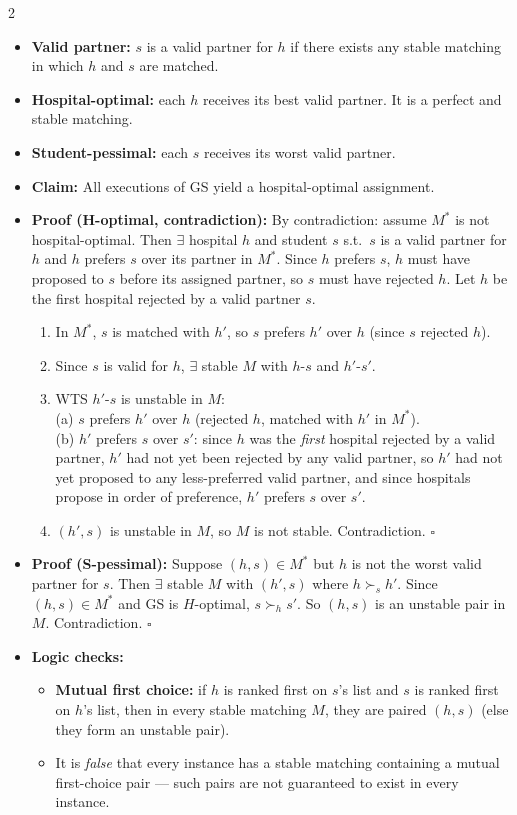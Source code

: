 \documentclass[9pt]{article}
\begin{document}
\begin{multicols}{2}
\begin{itemize}
  \item \textbf{Valid partner:} $s$ is a valid partner for $h$ if there exists any stable matching in which $h$ and $s$ are matched.
  \item \textbf{Hospital-optimal:} each $h$ receives its best valid partner. It is a perfect and stable matching.
  \item \textbf{Student-pessimal:} each $s$ receives its worst valid partner.
  \item \textbf{Claim:} All executions of GS yield a hospital-optimal assignment.
  \item \textbf{Proof (H-optimal, contradiction):} By contradiction: assume $M^*$ is not hospital-optimal. Then $\exists$ hospital $h$ and student $s$ s.t.\ $s$ is a valid partner for $h$ and $h$ prefers $s$ over its partner in $M^*$. Since $h$ prefers $s$, $h$ must have proposed to $s$ before its assigned partner, so $s$ must have rejected $h$. Let $h$ be the first hospital rejected by a valid partner $s$.
  \begin{enumerate}
    \item In $M^*$, $s$ is matched with $h'$, so $s$ prefers $h'$ over $h$ (since $s$ rejected $h$).
    \item Since $s$ is valid for $h$, $\exists$ stable $M$ with $h$-$s$ and $h'$-$s'$.
    \item WTS $h'$-$s$ is unstable in $M$:\\
      (a) $s$ prefers $h'$ over $h$ (rejected $h$, matched with $h'$ in $M^*$).\\
      (b) $h'$ prefers $s$ over $s'$: since $h$ was the \emph{first} hospital rejected by a valid partner, $h'$ had not yet been rejected by any valid partner, so $h'$ had not yet proposed to any less-preferred valid partner, and since hospitals propose in order of preference, $h'$ prefers $s$ over $s'$.
    \item $(h',s)$ is unstable in $M$, so $M$ is not stable. Contradiction. $\square$
  \end{enumerate}
  \item \textbf{Proof (S-pessimal):} Suppose $(h,s)\in M^*$ but $h$ is not the worst valid partner for $s$. Then $\exists$ stable $M$ with $(h',s)$ where $h\succ_s h'$. Since $(h,s)\in M^*$ and GS is $H$-optimal, $s\succ_h s'$. So $(h,s)$ is an unstable pair in $M$. Contradiction. $\square$
  \item \textbf{Logic checks:}
  \begin{itemize}
    \item \textbf{Mutual first choice:} if $h$ is ranked first on $s$'s list and $s$ is ranked first on $h$'s list, then in every stable matching $M$, they are paired $(h,s)$ (else they form an unstable pair).
    \item It is \emph{false} that every instance has a stable matching containing a mutual first-choice pair --- such pairs are not guaranteed to exist in every instance.
  \end{itemize}
\end{itemize}


\end{multicols}
\end{document}
